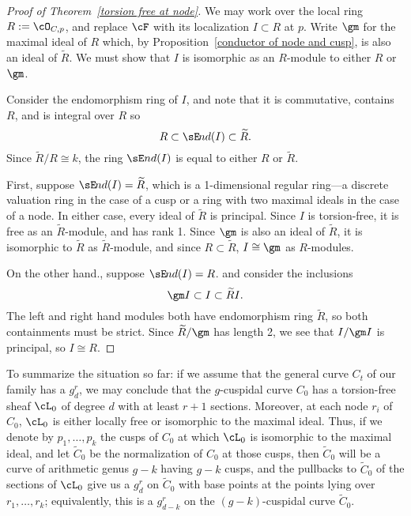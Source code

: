 \begin{proof}[Proof of Theorem~\ref{torsion free at node}] We may work over the local ring $R := \cO_{C,p}$, and replace $\cF$ with 
its localization $I\subset R$ at $p$. Write
$\gm$ for the maximal ideal of $R$ which, by Proposition~\ref{conductor of node and cusp}, is also an ideal of $\widetilde R$.
We must show that $I$ is isomorphic as an $R$-module to either $R$ or $\gm$.

\def\sEnd{{\sE \kern-1pt nd}}

Consider the endomorphism ring of $I$, and note that it is commutative, contains $R$,  and is integral over $R$ so 
$$
R \subset \sEnd(I) \subset \widetilde R.
$$
Since
$\widetilde R/R \cong k$, the ring $\sE nd(I)$ is equal to either 
$R$ or $\widetilde R$. 

First, suppose
$\sEnd(I)=\widetilde R$, which is a 1-dimensional regular ring---a discrete valuation ring in the case of a cusp
or a ring with two maximal ideals in the case of a node. In either case, every ideal of $\widetilde R$ is principal.
 Since $I$ is torsion-free, it is free as an 
$\widetilde R$-module, and has rank 1. Since $\gm$ is also an ideal of $\widetilde R$, it is isomorphic to $\widetilde R$
as $\widetilde R$-module, and since $R\subset \widetilde R$,
$I \cong \gm$ as $R$-modules.

On the other hand., suppose
$\sEnd(I)=R$.
 and consider the inclusions
$$
\gm I \subset I \subset \widetilde R I.
$$
The left and right hand modules both have endomorphism ring $\widetilde R$,
so both containments must be strict. Since $\widetilde R/\gm$ has length 2,
we see that $I/\gm I$ is principal, so $I\cong R$.
\end{proof}

To summarize the situation so far: if we assume that the general curve $C_t$ of our family has a $g^r_d$, we may conclude that the $g$-cuspidal curve $C_0$ has a torsion-free sheaf $\cL_0$ of degree $d$ with at least $r+1$ sections.  Moreover, at each node $r_i$ of $C_0$, $\cL_0$ is either locally free or isomorphic to the maximal ideal. Thus, if we denote by $p_1,\dots, p_k$ the cusps of $C_0$ at which $\cL_0$ is isomorphic to the maximal ideal, and let $\widetilde C_0$ be the normalization of $C_0$ at those cusps, then $\widetilde C_0$ will be a curve of arithmetic genus $g-k$ having $g-k$ cusps, and
the pullbacks to $\widetilde C_0$ of the sections of $\cL_0$ give us a $g^r_d$ on $\widetilde C_0$ with base points at the points lying over $r_1,\dots,r_k$; equivalently, this is a $g^r_{d-k}$ on the $(g-k)$-cuspidal curve  $\widetilde C_0$.



